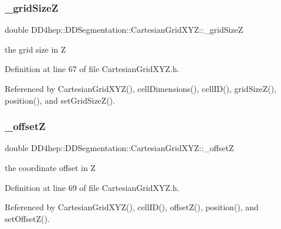 \subsubsection{\texorpdfstring{\+\_\+grid\+SizeZ}{\_gridSizeZ}}
{\footnotesize\ttfamily double D\+D4hep\+::\+D\+D\+Segmentation\+::\+Cartesian\+Grid\+X\+Y\+Z\+::\+\_\+grid\+SizeZ\hspace{0.3cm}{\ttfamily [protected]}}



the grid size in Z 



Definition at line 67 of file Cartesian\+Grid\+X\+Y\+Z.\+h.



Referenced by Cartesian\+Grid\+X\+Y\+Z(), cell\+Dimensions(), cell\+I\+D(), grid\+Size\+Z(), position(), and set\+Grid\+Size\+Z().

\hypertarget{class_d_d4hep_1_1_d_d_segmentation_1_1_cartesian_grid_x_y_z_a1578ef683b88f0d4897c354885a488b8}{}\label{class_d_d4hep_1_1_d_d_segmentation_1_1_cartesian_grid_x_y_z_a1578ef683b88f0d4897c354885a488b8} 
\subsubsection{\texorpdfstring{\+\_\+offsetZ}{\_offsetZ}}
{\footnotesize\ttfamily double D\+D4hep\+::\+D\+D\+Segmentation\+::\+Cartesian\+Grid\+X\+Y\+Z\+::\+\_\+offsetZ\hspace{0.3cm}{\ttfamily [protected]}}



the coordinate offset in Z 



Definition at line 69 of file Cartesian\+Grid\+X\+Y\+Z.\+h.



Referenced by Cartesian\+Grid\+X\+Y\+Z(), cell\+I\+D(), offset\+Z(), position(), and set\+Offset\+Z().

\hypertarget{class_d_d4hep_1_1_d_d_segmentation_1_1_cartesian_grid_x_y_z_ab6ef126016dd03434b814590c0ca64f9}{}\label{class_d_d4hep_1_1_d_d_segmentation_1_1_cartesian_grid_x_y_z_ab6ef126016dd03434b814590c0ca64f9} 
